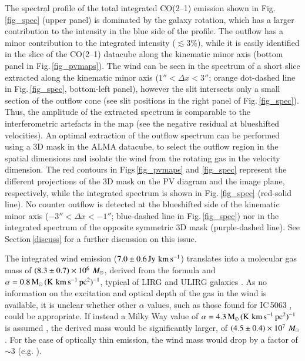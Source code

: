 \documentclass[longauth]{aa}
\newcommand{\msun}{\,\hbox{$M_{\odot}$}}
\newcommand{\kms}{\,\hbox{\hbox{km}\,\hbox{s}$^{-1}$}}
\begin{document}
The spectral profile of the total integrated CO(2--1) emission shown in Fig.\,\ref{fig_spec} (upper panel) is dominated by the galaxy rotation, which has a larger contribution to the intensity in the blue side of the profile. The outflow has a minor contribution to the integrated intensity ($\lesssim 3\%$), while it is easily identified in the slice of the CO(2--1) datacube along the kinematic minor axis (bottom panel in Fig.\,\ref{fig_pvmaps}). 
The wind can be seen in the spectrum of a short slice extracted along the kinematic minor axis ($1'' < \Delta x < 3''$; orange dot-dashed line in Fig.\,\ref{fig_spec}, bottom-left panel), however the slit intersects only a small section of the outflow cone (see slit positions in the right panel of Fig.\,\ref{fig_spec}). Thus, the amplitude of the extracted spectrum is comparable to the interferometric artefacts in the map (see the negative residual at blueshifted velocities). An optimal extraction of the outflow spectrum can be performed using a 3D mask in the ALMA datacube, to select the outflow region in the spatial dimensions and isolate the wind from the rotating gas in the velocity dimension. The red contours in Figs\,\ref{fig_pvmaps} and \ref{fig_spec} represent the different projections of the 3D mask on the PV diagram and the image plane, respectively, while the integrated spectrum is shown in Fig.\,\ref{fig_spec} (red-solid line). No counter outflow is detected at the blueshifted side of the kinematic minor axis ($-3'' < \Delta x < -1''$; blue-dashed line in Fig.\,\ref{fig_spec}) nor in the integrated spectrum of the opposite symmetric 3D mask (purple-dashed line). See Section\,\ref{discuss} for a further discussion on this issue.

The integrated wind emission ($7.0 \pm 0.6\, \rm{Jy\,\kms}$) translates into a molecular gas mass of $(8.3 \pm 0.7) \times 10^6\, \rm{\msun}$, derived from the  formula and $\alpha = 0.8\, \rm{M_\odot\,(K\,\kms\,pc^2)^{-1}}$, typical of LIRG and ULIRG galaxies . As no information on the excitation and optical depth of the gas in the wind is available, it is unclear whether other $\alpha$ values, such as those found for IC\,5063 , could be appropriate. If instead a Milky Way value of $\alpha = 4.3\, \rm{M_\odot\,(K\,\kms\,pc^2)^{-1}}$ is assumed , the derived mass would be significantly larger, of $(4.5 \pm 0.4) \times 10^7\, \rm{\msun}$. For the case of optically thin emission, the wind mass would drop by a factor of $\sim 3$ (e.g. ).
\end{document}

